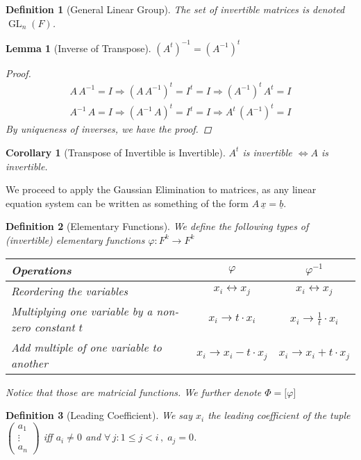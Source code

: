 \documentclass[12pt]{article}
\let\RA\Rightarrow
\let\LR\Leftrightarrow
\newcommand{\Forall}[1]{\forall\,{#1}\,,\;}
\newcommand{\tuple}[1]{\underline{#1}}
\DeclareMathOperator{\GL}{GL}
\newtheorem{definition}{Definition}[subsection]
\newtheorem{lemma}{Lemma}[subsection]
\newtheorem{corollary}{Corollary}[subsection]
\begin{document}
\begin{definition}[General Linear Group]
  The set of invertible matrices is denoted $\GL_n(F)$.
\end{definition}

\begin{lemma}[Inverse of Transpose]
  $(A^t)^{-1}=(A^{-1})^t$
  \begin{proof}
    \begin{align*}
      A\,A^{-1}=I\RA (A\,A^{-1})^t=I^t=I\RA (A^{-1})^t\,A^t=I\\
      A^{-1}\,A=I\RA (A^{-1}\,A)^t=I^t=I\RA A^t\,(A^{-1})^t=I
    \end{align*}
    By uniqueness of inverses, we have the proof.
  \end{proof}
\end{lemma}

\begin{corollary}[Transpose of Invertible is Invertible]
  $A^t$ is invertible $\LR A$ is invertible.
\end{corollary}

We proceed to apply the Gaussian Elimination to matrices, as any linear equation system can be written as something of the form $A\,\tuple{x}=\tuple{b}$.

\begin{definition}[Elementary Functions]
  We define the following types of (invertible) elementary functions $\varphi: F^k\to F^k$

  \begin{table}[H]
    \centering
    \begin{tabular}{|p{5cm}|c|c|}\hline
      Operations & $\varphi$ & $\varphi^{-1}$\\\hline
      Reordering the variables & $x_i\leftrightarrow x_j$ & $x_i\leftrightarrow x_j$ \\\hline
      Multiplying one variable by a non-zero constant $t$ & $x_i\rightarrow t\cdot x_i$ & $x_i\rightarrow \frac{1}{t}\cdot x_i$\\\hline
      Add multiple of one variable to another & $x_i\rightarrow x_i-t\cdot x_j$ & $x_i\rightarrow x_i+t\cdot x_j$\\\hline
    \end{tabular}
  \end{table}

  Notice that those are matricial functions. We further denote $\Phi=\big[\varphi\big]$
\end{definition}

\begin{definition}[Leading Coefficient]
  We say $x_i$ the leading coefficient of the tuple $\begin{pmatrix}a_1\\\vdots\\a_n\end{pmatrix}$ iff $a_i\neq 0$ and $\Forall{j: 1\leq j<i} a_j=0$.
\end{definition}
\end{document}

